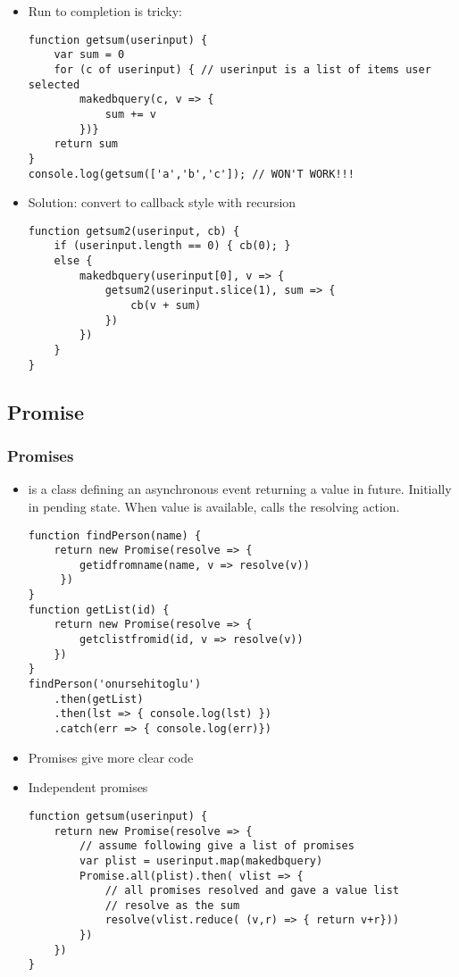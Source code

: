 \documentclass[trans,compress,xcolor=table]{beamer}
\begin{document}
\begin{frame}[fragile]
\begin{itemize}
\item Run to completion is tricky:
\begin{lstlisting}
function getsum(userinput) {
	var sum = 0
	for (c of userinput) { // userinput is a list of items user selected
		makedbquery(c, v => {
			sum += v
		})} 
	return sum
}
console.log(getsum(['a','b','c']); // WON'T WORK!!!
\end{lstlisting}
\item  Solution: convert to callback style with recursion
\begin{lstlisting}
function getsum2(userinput, cb) {
	if (userinput.length == 0) { cb(0); }
	else {
		makedbquery(userinput[0], v => {
			getsum2(userinput.slice(1), sum => {
				cb(v + sum)
			})		
		})
	}
}
\end{lstlisting}
\end{itemize}
\end{frame}

\subsection*{Promise}
\begin{frame}[fragile]
\frametitle{Promises}
\begin{itemize}
\item {} is a class defining an asynchronous event returning a value in future. Initially in pending state. When value is available, calls the  resolving action.
\begin{lstlisting}
function findPerson(name) {
	return new Promise(resolve => {
		getidfromname(name, v => resolve(v))
	 })
}
function getList(id) {
	return new Promise(resolve => {
		getclistfromid(id, v => resolve(v))
	})
}
findPerson('onursehitoglu')
	.then(getList)
	.then(lst => { console.log(lst) })
	.catch(err => { console.log(err)})
\end{lstlisting}
\item Promises give more clear code
\end{itemize}
\end{frame}

\begin{frame}[fragile]
\begin{itemize}
\item Independent promises
\begin{lstlisting}
function getsum(userinput) {
	return new Promise(resolve => {
		// assume following give a list of promises
		var plist = userinput.map(makedbquery)
		Promise.all(plist).then( vlist => {
			// all promises resolved and gave a value list
			// resolve as the sum
			resolve(vlist.reduce( (v,r) => { return v+r}))
		})
	})
}
\end{lstlisting}
\end{itemize}
\end{frame}
\end{document}
